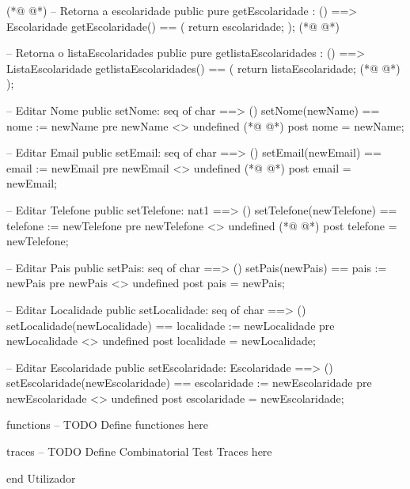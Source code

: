 \begin{vdmpp}[breaklines=true]
(*@
\label{setNome:176}
@*)
 -- Retorna a escolaridade
 public pure getEscolaridade : () ==> Escolaridade
 getEscolaridade() ==
 (
  return escolaridade;
 );
(*@
\label{setEmail:182}
@*)
 
 -- Retorna o listaEscolaridades
 public pure getlistaEscolaridades : () ==> ListaEscolaridade
 getlistaEscolaridades() ==
 (
  return listaEscolaridade;
(*@
\label{setTelefone:188}
@*)
 );
 
 -- Editar Nome
 public setNome: seq of char ==> ()
 setNome(newName) == nome := newName
 pre newName <> undefined
(*@
\label{setPais:194}
@*)
 post nome = newName;
 
 -- Editar Email
 public setEmail: seq of char ==> ()
 setEmail(newEmail) == email := newEmail
 pre newEmail <> undefined
(*@
\label{setLocalidade:200}
@*)
 post email = newEmail;
 
 -- Editar Telefone
 public setTelefone: nat1 ==> ()
 setTelefone(newTelefone) == telefone := newTelefone
 pre newTelefone <> undefined
(*@
\label{setEscolaridade:206}
@*)
 post telefone = newTelefone;

 -- Editar Pais
 public setPais: seq of char ==> ()
 setPais(newPais) == pais := newPais
 pre newPais <> undefined
 post pais = newPais;
 
 -- Editar Localidade
 public setLocalidade: seq of char ==> ()
 setLocalidade(newLocalidade) == localidade := newLocalidade
 pre newLocalidade <> undefined
 post localidade = newLocalidade;
 
 -- Editar Escolaridade
 public setEscolaridade: Escolaridade ==> ()
 setEscolaridade(newEscolaridade) == escolaridade := newEscolaridade
 pre newEscolaridade <> undefined
 post escolaridade = newEscolaridade;
 
functions
-- TODO Define functiones here

traces
-- TODO Define Combinatorial Test Traces here

end Utilizador
\end{vdmpp}
\bigskip
